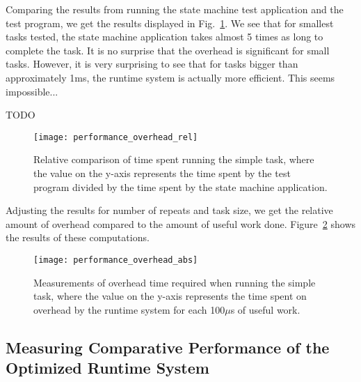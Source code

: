 Comparing the results from running the state machine test application and the test program, we get the results displayed in Fig.~\ref{fig:performance_overhead_rel}. We see that for smallest tasks tested, the state machine application takes almost 5 times as long to complete the task. It is no surprise that the overhead is significant for small tasks. However, it is very surprising to see that for tasks bigger than approximately 1ms, the runtime system is actually more efficient. This seems impossible...

TODO

\begin{figure}[htp]
	\centering
	\texttt{[image: performance\_overhead\_rel]}
	\caption[Results of performance overhead test, relative comparison]{Relative comparison of time spent running the simple task, where the value on the y-axis represents the time spent by the test program divided by the time spent by the state machine application.}
	\label{fig:performance_overhead_rel}
\end{figure}

Adjusting the results for number of repeats and task size, we get the relative amount of overhead compared to the amount of useful work done. Figure~\ref{fig:performance_overhead_abs} shows the results of these computations. 


\begin{figure}[htp]
	\centering
	\texttt{[image: performance\_overhead\_abs]}
	\caption[Results of performance overhead test, absolute comparison]{Measurements of overhead time required when running the simple task, where the value on the y-axis represents the time spent on overhead by the runtime system for each 100$\mu$s of useful work.}
	\label{fig:performance_overhead_abs}
\end{figure}



\subsection{Measuring Comparative Performance of the Optimized Runtime System}
\label{sec:comp_performance_overhead}

